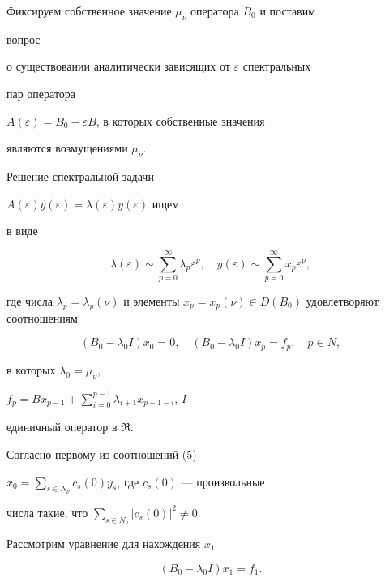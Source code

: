  


Фиксируем собственное значение $\mu_\nu$ оператора $B_0$ и поставим 


вопрос 


о существовании аналитически зависящих от $\varepsilon$ спектральных 


пар оператора 


$A(\varepsilon)=B_0-\varepsilon B$, в которых собственные значения 


являются возмущениями $\mu_\nu$. 


Решение спектральной задачи 


$A(\varepsilon)y(\varepsilon)=\lambda(\varepsilon)y(\varepsilon)$ ищем 


в виде 


$$ 


\lambda(\varepsilon)\sim\sum^\infty_{p=0}\lambda_p\varepsilon^p,\quad 


y(\varepsilon)\sim\sum^\infty_{p=0}x_p\varepsilon^p, 


$$ 


где числа $\lambda_p=\lambda_p(\nu)$ и элементы $x_p=x_p(\nu)\in 


D(B_0)$ удовлетворяют соотношениям 


\begin{equation} 


(B_0-\lambda_0I)x_0=0,\quad 


(B_0-\lambda_0I)x_p=f_p,\quad p\in N, 


\end{equation} 


в которых $\lambda_0=\mu_\nu$, 


$f_p=B x_{p-1}+\sum\limits^{p-1}_{i=0}\lambda_{i+1}x_{p-1-i}$, $I$ --- 


единичный оператор в $\Re$. 


Согласно первому из соотношений (5) 


$x_0=\sum\limits_{s\in N_\nu}c_s(0)y_s$, где $c_s(0)$ --- произвольные 


числа такие, что $\sum\limits_{s\in N_\nu}|c_s(0)|^2\ne 0$. 


 


Рассмотрим уравнение для нахождения $x_1$ 


\begin{equation} 


(B_0-\lambda_0I)x_1=f_1. 


\end{equation} 


